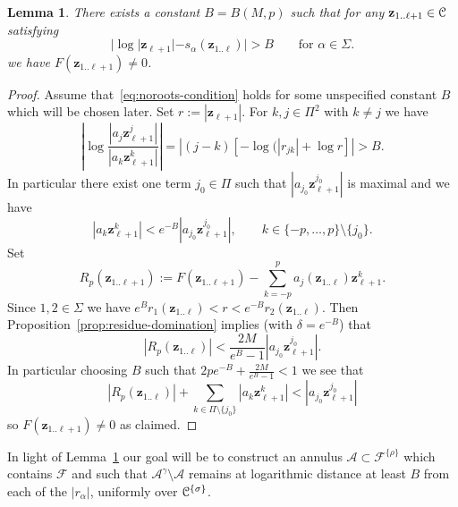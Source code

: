 \documentclass[reqno]{amsart}
\newtheorem{Lem}[Cor]{Lemma}{\bfseries}{\itshape}
\renewcommand\~[1]{\widetilde{#1}}
\def\cF{{\mathcal F}} \def\cL{{\mathcal L}} \def\cR{{\mathcal R}}
\def\cA{{\mathcal A}}
\def\vz{{\mathbf z}}
\def\he#1{{\{#1\}}}
\def\hrho{{\he\rho}}
\def\hsigma{{\he\sigma}}
\begin{document}
\begin{Lem}\label{lem:norootsfaraway}  
  There exists a constant $B=B(M,p)$ such that for any
  $\vz_{1..\ell+1}\in\cC$ satisfying
  \begin{equation}\label{eq:noroots-condition}
    |\log |\vz_{\ell+1}|-s_\alpha(\vz_{1..\ell})| > B \qquad\text{for }\alpha\in\Sigma.
  \end{equation}
  we have $F(\vz_{1..\ell+1})\neq0$.
\end{Lem}
\begin{proof}
  Assume that~\eqref{eq:noroots-condition} holds for some unspecified
  constant $B$ which will be chosen later. Set
  $r:=|\vz_{\ell+1}|$. For $k,j\in\Pi^2$ with $k\neq j$ we have
  \begin{equation}
    \left\vert\log \frac{|a_j \vz_{\ell+1}^j|}{|a_k 
        \vz_{\ell+1}^k|}\right\vert=
    \left|(j-k)[-\log(|r_{jk}|+\log r]\right| > B.
  \end{equation}
  In particular there exist one term $j_0\in\Pi$ such that
  $|a_{j_0} \vz_{\ell+1}^{j_0}|$ is maximal and we have
  \begin{equation}
    |a_{k} \vz_{\ell+1}^{k}|< e^{-B}|a_{j_0} \vz_{\ell+1}^{j_0}|,
    \qquad k\in\{-p,\ldots,p\}\setminus\{j_0\}.
  \end{equation}
  Set
  \begin{equation}
    R_p(\vz_{1..\ell+1}) := F(\vz_{1..\ell+1})-\sum_{k=-p}^p a_j(\vz_{1..\ell})\vz_{\ell+1}^k.
  \end{equation}
  Since $1,2\in\Sigma$ we have
  $e^B r_1(\vz_{1..\ell})<r<e^{-B}r_2(\vz_{1..\ell})$. Then
  Proposition~\ref{prop:residue-domination} implies (with
  $\delta=e^{-B}$) that
  \begin{equation}
    |R_p(\vz_{1..\ell})| < \frac{2M}{e^B-1}|a_{j_0} \vz_{\ell+1}^{j_0}|.
  \end{equation}
  In particular choosing $B$ such that
  $2pe^{-B}+\frac{2M}{e^B-1}<1$ we see that
  \begin{equation}
    |R_p(\vz_{1..\ell})|+\sum_{k\in\Pi\setminus\{j_0\}} |a_{k}
    \vz_{\ell+1}^{k}| < |a_{j_0} \vz_{\ell+1}^{j_0}| 
  \end{equation}
  so $F(\vz_{1..\ell+1})\neq0$ as claimed.
\end{proof}

In light of Lemma~\ref{lem:norootsfaraway} our goal will be to
construct an annulus $\cA\subset\cF^\hrho$ which contains $\cF$ and
such that $\cA^\gamma\setminus\cA$ remains at logarithmic distance at
least $B$ from each of the $|r_\alpha|$, uniformly over
$\cC^\hsigma$.
\end{document}
